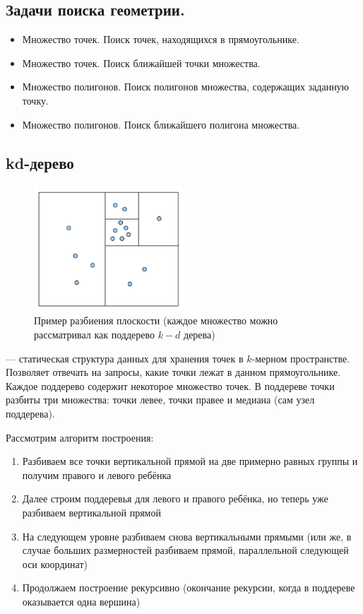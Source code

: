 \subsection{Задачи поиска геометрии.}
\begin{itemize}
  \item Множество точек. Поиск точек, находящихся в прямоугольнике.
  \item Множество точек. Поиск ближайшей точки множества.
  \item Множество полигонов. Поиск полигонов множества, содержащих заданную точку.
  \item Множество полигонов. Поиск ближайшего полигона множества.
\end{itemize}

\subsection{kd-дерево}
\begin{figure}[H]    
  \centering    
  \includegraphics[width=0.5\textwidth]{figures/kdTree.png}    
  \caption*{Пример разбиения плоскости (каждое множество можно рассматривал как поддерево $k-d$ дерева)}   
\end{figure} 
\begin{definition}
   --- статическая структура данных для хранения точек в $k$-мерном пространстве.
  Позволяет отвечать на запросы, какие точки лежат в данном прямоугольнике. Каждое поддерево содержит
  некоторое множество точек. В поддереве точки разбиты три множества: точки левее, точки правее и 
  медиана (сам узел поддерева).
\end{definition}

Рассмотрим алгоритм построения:
\begin{enumerate}
  \item Разбиваем все точки вертикальной прямой на две примерно равных группы и получим правого и левого
    ребёнка
  \item Далее строим поддеревья для левого и правого ребёнка, но теперь уже разбиваем вертикальной прямой
  \item На следующем уровне разбиваем снова вертикальными прямыми (или же, в случае больших размерностей
    разбиваем прямой, параллельной следующей оси координат)
  \item Продолжаем построение рекурсивно (окончание рекурсии, когда в поддереве оказывается одна вершина)
\end{enumerate}

